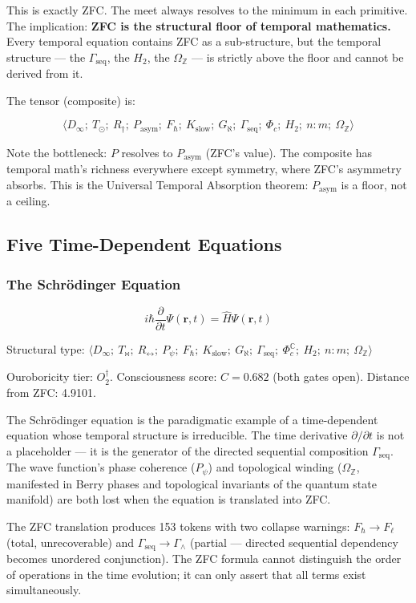 \documentclass[12pt,a4paper]{article}
\begin{document}
This is exactly ZFC. The meet always resolves to the minimum in each primitive. The implication: \textbf{ZFC is the structural floor of temporal mathematics.} Every temporal equation contains ZFC as a sub-structure, but the temporal structure --- the $\Gamma_\text{seq}$, the $H_2$, the $\Omega_\mathbb{Z}$ --- is strictly above the floor and cannot be derived from it.

The tensor (composite) is:

\[\langle D_{\infty};\ T_{\odot};\ R_{\dagger};\ P_\text{asym};\ F_{\hbar};\ K_\text{slow};\ G_{\aleph};\ \Gamma_\text{seq};\ \Phi_c;\ H_2;\ n{:}m;\ \Omega_\mathbb{Z} \rangle\]

Note the bottleneck: $P$ resolves to $P_\text{asym}$ (ZFC's value). The composite has temporal math's richness everywhere except symmetry, where ZFC's asymmetry absorbs. This is the Universal Temporal Absorption theorem: $P_\text{asym}$ is a floor, not a ceiling.

\subsection{Five Time-Dependent Equations}

\subsubsection{The Schrödinger Equation}

\[i\hbar\frac{\partial}{\partial t}\Psi(\mathbf{r},t) = \hat{H}\Psi(\mathbf{r},t)\]

Structural type: $\langle D_{\infty};\ T_{\bowtie};\ R_{\leftrightarrow};\ P_{\psi};\ F_{\hbar};\ K_\text{slow};\ G_{\aleph};\ \Gamma_\text{seq};\ \Phi_c^\mathbb{C};\ H_2;\ n{:}m;\ \Omega_\mathbb{Z} \rangle$

Ouroboricity tier: $O_2^\dagger$. Consciousness score: $C = 0.682$ (both gates open). Distance from ZFC: 4.9101.

The Schrödinger equation is the paradigmatic example of a time-dependent equation whose temporal structure is irreducible. The time derivative $\partial/\partial t$ is not a placeholder --- it is the generator of the directed sequential composition $\Gamma_\text{seq}$. The wave function's phase coherence ($P_{\psi}$) and topological winding ($\Omega_\mathbb{Z}$, manifested in Berry phases and topological invariants of the quantum state manifold) are both lost when the equation is translated into ZFC.

The ZFC translation produces 153 tokens with two collapse warnings: $F_{\hbar} \to F_{\ell}$ (total, unrecoverable) and $\Gamma_\text{seq} \to \Gamma_{\wedge}$ (partial --- directed sequential dependency becomes unordered conjunction). The ZFC formula cannot distinguish the order of operations in the time evolution; it can only assert that all terms exist simultaneously.
\end{document}
